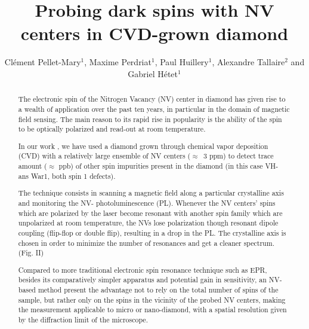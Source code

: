 \documentclass[aps,twocolumn,showpacs]{revtex4-1}
\begin{document}
\title{Probing dark spins with NV centers in CVD-grown diamond}

\author{Clément Pellet-Mary$^{1}$, Maxime Perdriat$^1$, Paul Huillery$^1$, Alexandre Tallaire$^2$ and Gabriel Hétet$^1$}

\begin{abstract}
\normalsize
The electronic spin of the Nitrogen Vacancy (NV) center in diamond has given rise to a wealth of application over the past ten years, in particular in the domain of magnetic field sensing. The main reason to its rapid rise in popularity is the ability of the spin to be optically polarized and read-out at room temperature.

In our work \citep{Ref2}, we have used a diamond grown through chemical vapor deposition (CVD) with a relatively large ensemble of NV centers ($\approx$~3 ppm) to detect trace amount ($\approx$ ppb) of other spin impurities present in the diamond (in this case VH- ans War1, both spin 1 defects).

The technique consists in scanning a magnetic field along a particular crystalline axis and monitoring the NV- photoluminescence (PL). Whenever the NV centers' spins which are polarized by the laser become resonant with another spin family which are unpolarized at room temperature, the NVs lose polarization though resonant dipole coupling (flip-flop or double flip), resulting in a drop in the PL. The crystalline axis is chosen in order to minimize the number of resonances and get a cleaner spectrum. (Fig. II)

Compared to more traditional electronic spin resonance technique such as EPR, besides its comparatively simpler apparatus and potential gain in sensitivity, an NV-based method present the advantage not to rely on the total number of spins of the sample, but rather only on the spins in the vicinity of the probed NV centers, making the measurement applicable to micro or nano-diamond, with a spatial resolution given by the diffraction limit of the microscope.


\end{abstract}
\end{document}
